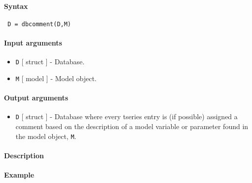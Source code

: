 


	\paragraph{Syntax}\label{syntax}

\begin{verbatim}
 D = dbcomment(D,M)
\end{verbatim}

\paragraph{Input arguments}\label{input-arguments}

\begin{itemize}
\item
  \texttt{D} {[} struct {]} - Database.
\item
  \texttt{M} {[} model {]} - Model object.
\end{itemize}

\paragraph{Output arguments}\label{output-arguments}

\begin{itemize}
\itemsep1pt\parskip0pt
\item
  \texttt{D} {[} struct {]} - Database where every tseries entry is (if
  possible) assigned a comment based on the description of a model
  variable or parameter found in the model object, \texttt{M}.
\end{itemize}

\paragraph{Description}\label{description}

\paragraph{Example}\label{example}


